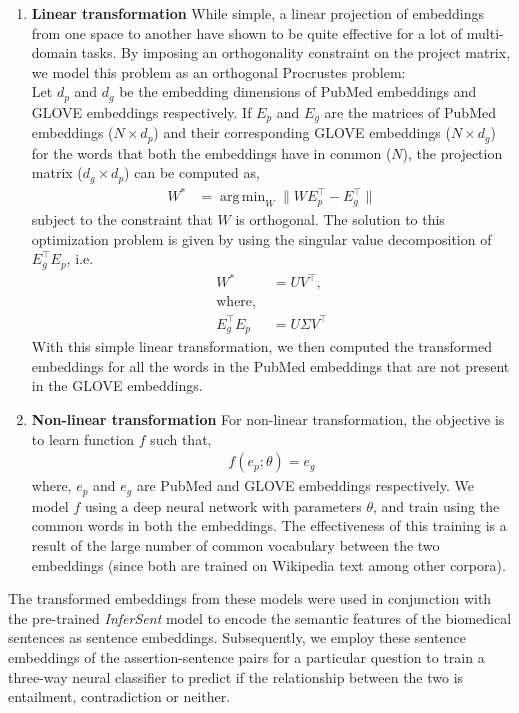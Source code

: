 \documentclass[11pt,a4paper]{article}
\DeclareMathOperator*{\argmin}{arg\,min}
\begin{document}
\begin{enumerate}
    \item \textbf{Linear transformation}
    While simple, a linear projection of embeddings from one space to another have shown to be quite effective for a lot of multi-domain tasks. By imposing an orthogonality constraint on the project matrix, we model this problem as an orthogonal Procrustes problem: \\
    Let $d_p$ and $d_g$ be the embedding dimensions of PubMed embeddings and GLOVE embeddings respectively.
    If $E_p$ and $E_g$ are the matrices of PubMed embeddings ($N \times d_p$) and their corresponding GLOVE embeddings ($N \times d_g$) for the words that both the embeddings have in common ($N$), the projection matrix ($d_g \times d_p$) can be computed as,
    \begin{align*}
        W^* &= \argmin_W \lVert  W E_p^{\intercal} - E_g^{\intercal} \rVert
    \end{align*}
    subject to the constraint that $W$ is orthogonal.
    The solution to this optimization problem is given by using the singular value decomposition of $E_g^{\intercal} E_p$, i.e.
    \begin{align*}
        W^* &= UV^{\intercal}, \\
        \text{where, } \\
        E_g^{\intercal} E_p &= U \Sigma V^{\intercal}
    \end{align*}
    With this simple linear transformation, we then computed the transformed embeddings for all the words in the PubMed embeddings that are not present in the GLOVE embeddings. 
    \item \textbf{Non-linear transformation}
    For non-linear transformation, the objective is to learn function $f$ such that,
    \begin{align*}
        f(e_p; \theta) = e_g
    \end{align*}
    where, $e_p$ and $e_g$ are PubMed and GLOVE embeddings respectively. We model $f$ using a deep neural network with parameters $\theta$, and train using the common words in both the embeddings. The effectiveness of this training is a result of the large number of common vocabulary between the two embeddings (since both are trained on Wikipedia text among other corpora).

    \end{enumerate}

    The transformed embeddings from these models were used in conjunction with the pre-trained \textit{InferSent} model to encode the semantic features of the biomedical sentences as sentence embeddings. Subsequently, we employ these sentence embeddings of the assertion-sentence pairs for a particular question to train a three-way neural classifier to predict if the relationship between the two is entailment, contradiction or neither. 
    
\end{document}
